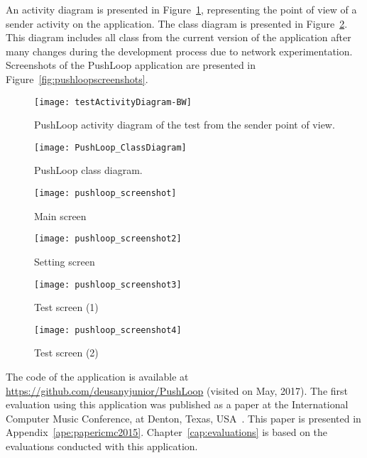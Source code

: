 An activity diagram is presented in Figure~\ref{fig:pushloopactivityDiagram}, representing the point of view of a sender activity on the application.
The class diagram is presented in Figure~\ref{fig:pushloopclassdiagram}.
This diagram includes all class from the current version of the application after many changes during the development process due to network experimentation.
Screenshots of the PushLoop application are presented in Figure~\ref{fig:pushloopscreenshots}.

\begin{figure}[!ht]
	\centering
	\texttt{[image: testActivityDiagram-BW]}
	\caption{PushLoop activity diagram of the test from the sender point of view.}
	\label{fig:pushloopactivityDiagram}
\end{figure}

\begin{figure}[!ht]
	\centering
	\texttt{[image: PushLoop\_ClassDiagram]}
	\caption{PushLoop class diagram.}
	\label{fig:pushloopclassdiagram}
\end{figure}

\begin{figure*}[!ht]
	\centering
	\begin{subfigure}{.22\textwidth}
		\texttt{[image: pushloop\_screenshot]}
		\caption{Main screen}
		\label{fig:pushloopss1}
	\end{subfigure}
	\begin{subfigure}{.22\textwidth}
		\centering
		\texttt{[image: pushloop\_screenshot2]}
		\caption{Setting screen}
		\label{fig:pushloopss2}
	\end{subfigure}
	\begin{subfigure}{.22\textwidth}
		\texttt{[image: pushloop\_screenshot3]}
		\caption{Test screen (1)}
		\label{fig:pushloopss3}
	\end{subfigure}
	\begin{subfigure}{.22\textwidth}
		\texttt{[image: pushloop\_screenshot4]}
		\caption{Test screen (2)}
		\label{fig:pushloopss4}
	\end{subfigure}
	
	\caption{PushLoop application screenshots.}
	\label{fig:pushloopscreenshots}
\end{figure*}

The code of the application is available at \url{https://github.com/deusanyjunior/PushLoop} (visited on May, 2017). 
The first evaluation using this application was published as a paper at the International Computer Music Conference, at Denton, Texas, USA~\citep{deCarvalhoJunior2015computer}.
This paper is presented in Appendix~\ref{ape:papericmc2015}.
Chapter~\ref{cap:evaluations} is based on the evaluations conducted with this application.



